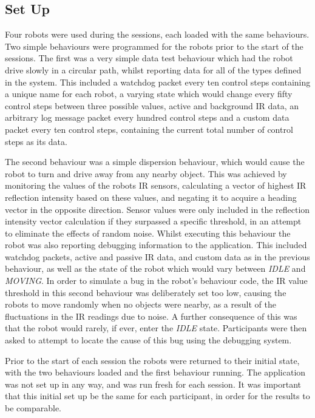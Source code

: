 \subsection{Set Up}
Four robots were used during the sessions, each loaded with the same behaviours. Two simple behaviours were programmed for the robots prior to the start of the sessions. The first was a very simple data test behaviour which had the robot drive slowly in a circular path, whilst reporting data for all of the types defined in the system. This included a watchdog packet every ten control steps containing a unique name for each robot, a varying state which would change every fifty control steps between three possible values, active and background IR data, an arbitrary log message packet every hundred control steps and a custom data packet every ten control steps, containing the current total number of control steps as its data. 

The second behaviour was a simple dispersion behaviour, which would cause the robot to turn and drive away from any nearby object. This was achieved by monitoring the values of the robots IR sensors, calculating a vector of highest IR reflection intensity based on these values, and negating it to acquire a heading vector in the opposite direction. Sensor values were only included in the reflection intensity vector calculation if they surpassed a specific threshold, in an attempt to eliminate the effects of random noise. Whilst executing this behaviour the robot was also reporting debugging information to the application. This included watchdog packets, active and passive IR data, and custom data as in the previous behaviour, as well as the state of the robot which would vary between \textit{IDLE} and \textit{MOVING}. In order to simulate a bug in the robot's behaviour code, the IR value threshold in this second behaviour was deliberately set too low, causing the robots to move randomly when no objects were nearby, as a result of the fluctuations in the IR readings due to noise. A further consequence of this was that the robot would rarely, if ever, enter the \textit{IDLE} state. Participants were then asked to attempt to locate the cause of this bug using the debugging system.

Prior to the start of each session the robots were returned to their initial state, with the two behaviours loaded and the first behaviour running. The application was not set up in any way, and was run fresh for each session. It was important that this initial set up be the same for each participant, in order for the results to be comparable.

